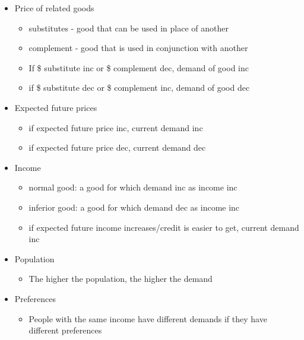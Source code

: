 \documentclass[11pt]{article}
\begin{document}
\begin{itemize}
\begin{itemize}
\item Price of related goods
\begin{itemize}
\item substitutes - good that can be used in place of another
\item complement - good that is used in conjunction with another
\item If \$ substitute inc or \$ complement dec, demand of good inc
\item if \$ substitute dec or \$ complement inc, demand of good dec
\end{itemize}
\item Expected future prices
\begin{itemize}
\item if expected future price inc, current demand inc
\item if expected future price dec, current demand dec
\end{itemize}
\item Income
\begin{itemize}
\item normal good: a good for which demand inc as income inc
\item inferior good: a good for which demand dec as income inc
\item if expected future income increases/credit is easier to get, current demand inc
\end{itemize}
\item Population
\begin{itemize}
\item The higher the population, the higher the demand
\end{itemize}
\item Preferences
\begin{itemize}
\item People with the same income have different demands if they have different preferences
\end{itemize}
\end{itemize}
\end{itemize}
\end{document}
